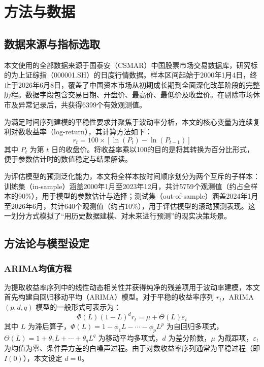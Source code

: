 \documentclass[12pt,a4paper]{ctexart}
\begin{document}
\section{方法与数据}

\subsection{数据来源与指标选取}

本文使用的全部数据来源于国泰安（CSMAR）中国股票市场交易数据库，研究标的为上证综指（000001.SH）的日度行情数据。样本区间起始于2000年1月4日，终止于2026年6月8日，覆盖了中国资本市场从初期成长期到全面深化改革阶段的完整历程。数据字段包含交易日期、开盘价、最高价、最低价及收盘价。在剔除市场休市及异常记录后，共获得6399个有效观测值。

为满足时间序列建模的平稳性要求并聚焦于波动率分析，本文的核心变量为连续复利对数收益率（log-return），其计算方法如下：
\begin{equation}\label{eq:logret}
r_t = 100 \times [\ln(P_t) - \ln(P_{t-1})]
\end{equation}
其中 $P_t$ 为第 $t$ 日的收盘价。将收益率乘以100的目的是将其转换为百分比形式，便于参数估计时的数值稳定与结果解读。

为评估模型的预测泛化能力，本文将全样本按时间顺序划分为两个互斥的子样本：训练集（in-sample）涵盖2000年1月至2023年12月，共计5759个观测值（约占全样本的90\%），用于模型的参数估计与选择；测试集（out-of-sample）涵盖2024年1月至2026年6月，共计640个观测值（约占10\%），用于评估模型的滚动预测表现。这一划分方式模拟了“用历史数据建模、对未来进行预测”的现实决策场景。

\subsection{方法论与模型设定}

\subsubsection{ARIMA均值方程}

为提取收益率序列中的线性动态相关性并获得纯净的残差项用于波动率建模，本文首先构建自回归移动平均（ARIMA）模型。对于平稳的收益率序列 $r_t$，ARIMA$(p,d,q)$ 模型的一般形式可表示为：
\begin{equation}\label{eq:arima}
\Phi(L)(1-L)^d r_t = \mu + \Theta(L)\varepsilon_t
\end{equation}
其中 $L$ 为滞后算子，$\Phi(L)=1-\phi_1L-\cdots-\phi_pL^p$ 为自回归多项式，$\Theta(L)=1+\theta_1L+\cdots+\theta_qL^q$ 为移动平均多项式，$d$ 为差分阶数，$\mu$ 为截距项，$\varepsilon_t$ 为均值为零、条件异方差的白噪声过程。由于对数收益率序列通常为平稳过程（即 $I(0)$），本文设定 $d=0$。
\end{document}
